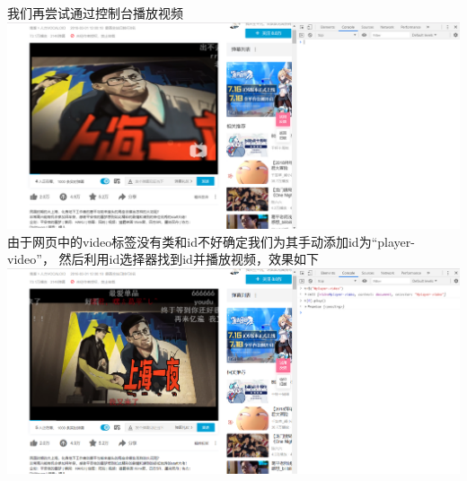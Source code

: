 \documentclass[UTF8]{ctexart}
\begin{document}
\begin{enumerate}
\begin{enumerate}
            我们再尝试通过控制台播放视频\\
            \includegraphics[scale=0.3]{06-27_6.png}
            由于网页中的video标签没有类和id不好确定我们为其手动添加id为``player-video''，
            然后利用id选择器找到id并播放视频，效果如下\\
            \includegraphics[scale=0.3]{06-27_7.png}  
        \end{enumerate} 
    \end{enumerate}
\end{document}
